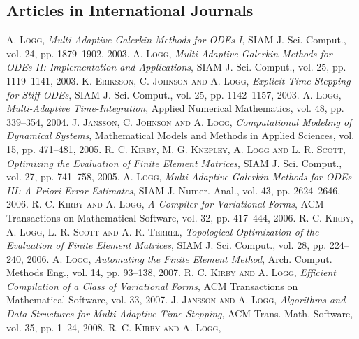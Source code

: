 \renewcommand \refname{ }

\begin{thebibliography}{99}
\subsection*{Articles in International Journals}
 {\textsc{A. Logg},
\textit{Multi-Adaptive {G}alerkin Methods for {ODE}s {I}},
SIAM J. Sci. Comput.,
vol. 24,
pp. 1879--1902,
2003.
}
 {\textsc{A. Logg},
\textit{Multi-Adaptive {G}alerkin Methods for {ODE}s {II}: {I}mplementation and Applications},
SIAM J. Sci. Comput.,
vol. 25,
pp. 1119--1141,
2003.
}
 {\textsc{K. Eriksson, C. Johnson and A. Logg},
\textit{Explicit Time-Stepping for Stiff {ODE}s},
SIAM J. Sci. Comput.,
vol. 25,
pp. 1142--1157,
2003.
}
 {\textsc{A. Logg},
\textit{Multi-Adaptive Time-Integration},
Applied Numerical Mathematics,
vol. 48,
pp. 339--354,
2004.
}
 {\textsc{J. Jansson, C. Johnson and A. Logg},
\textit{Computational Modeling of Dynamical Systems},
Mathematical Models and Methods in Applied Sciences,
vol. 15,
pp. 471--481,
2005.
}
 {\textsc{R. C. Kirby, M. G. Knepley, A. Logg and L. R. Scott},
\textit{Optimizing the Evaluation of Finite Element Matrices},
SIAM J. Sci. Comput.,
vol. 27,
pp. 741--758,
2005.
}
 {\textsc{A. Logg},
\textit{Multi-Adaptive {G}alerkin Methods for {ODE}s {III}: {A} Priori Error Estimates},
SIAM J. Numer. Anal.,
vol. 43,
pp. 2624--2646,
2006.
}
 {\textsc{R. C. Kirby and A. Logg},
\textit{A Compiler for Variational Forms},
ACM Transactions on Mathematical Software,
vol. 32,
pp. 417--444,
2006.
}
 {\textsc{R. C. Kirby, A. Logg, L. R. Scott and A. R. Terrel},
\textit{Topological Optimization of the Evaluation of Finite Element Matrices},
SIAM J. Sci. Comput.,
vol. 28,
pp. 224--240,
2006.
}
 {\textsc{A. Logg},
\textit{Automating the Finite Element Method},
Arch. Comput. Methods Eng.,
vol. 14,
pp. 93--138,
2007.
}
 {\textsc{R. C. Kirby and A. Logg},
\textit{Efficient Compilation of a Class of Variational Forms},
ACM Transactions on Mathematical Software,
vol. 33,
2007.
}
 {\textsc{J. Jansson and A. Logg},
\textit{Algorithms and Data Structures for Multi-Adaptive Time-Stepping},
ACM Trans. Math. Software,
vol. 35,
pp. 1--24,
2008.
}
 {\textsc{R. C. Kirby and A. Logg},
}
\end{thebibliography}
